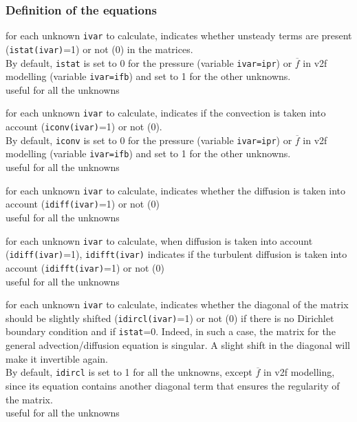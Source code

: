 \subsubsection{Definition of the equations}

{for each unknown {\tt ivar} to calculate, indicates whether
unsteady terms are present ({\tt istat(ivar)}=1) or not (0) in the matrices.\\
By default, {\tt istat} is set to 0 for the pressure (variable {\tt ivar=ipr})
or $\overline{f}$ in v2f modelling (variable {\tt ivar=ifb}) and set to
1 for the other unknowns.\\
useful for all the unknowns}

{for each unknown {\tt ivar} to calculate, indicates if the
convection is taken into account ({\tt iconv(ivar)}=1) or not (0).\\
By default, {\tt iconv} is set to 0 for the pressure (variable {\tt ivar=ipr})
or $\overline{f}$ in v2f modelling (variable {\tt ivar=ifb}) and set to
1 for the other unknowns.\\
useful for all the unknowns}

{for each unknown {\tt ivar} to calculate, indicates whether the
diffusion is taken into account ({\tt idiff(ivar)}=1) or not (0)\\
useful for all the unknowns}

{for each unknown {\tt ivar} to calculate, when diffusion is taken
into account ({\tt idiff(ivar)}=1), {\tt idifft(ivar)} indicates if the turbulent
diffusion is taken into account ({\tt idifft(ivar)}=1) or not (0)\\
useful for all the unknowns }

{for each unknown {\tt ivar} to calculate, indicates whether the diagonal
of the matrix should be slightly shifted ({\tt idircl(ivar)}=1) or not (0) if there
is no Dirichlet boundary condition and if {\tt istat}=0. Indeed, in such a case,
the matrix for the general advection/diffusion equation is singular. A slight
shift in the diagonal will make it invertible again.\\
By default, {\tt idircl} is set to 1 for all the unknowns, except $\overline{f}$ in
v2f modelling, since its equation contains another diagonal term that ensures
the regularity of the matrix.\\
useful for all the unknowns}

